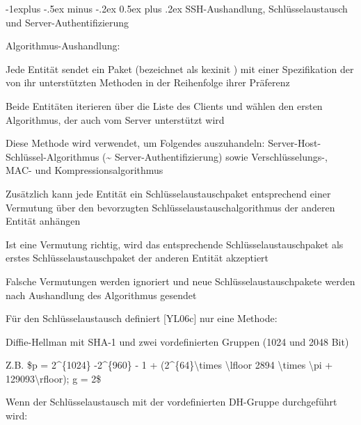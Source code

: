 \documentclass[a4paper]{article}
\makeatletter
\renewcommand{\subsection}{\@startsection{subsection}{2}{0mm}%
 {-1explus -.5ex minus -.2ex}%
 {0.5ex plus .2ex}%
 {\normalfont\normalsize\bfseries}}
\makeatother
\begin{document}
\begin{multicols}{3}
\begin{itemize*}
            \subsection{SSH-Aushandlung, Schlüsselaustausch und
                  Server-Authentifizierung}

            \begin{itemize*}
                  \item
                  Algorithmus-Aushandlung:

                  \begin{itemize*}
                        \item Jede Entität sendet ein Paket (bezeichnet als kexinit ) mit einer Spezifikation der von ihr unterstützten Methoden in der Reihenfolge ihrer Präferenz
                        \item Beide Entitäten iterieren über die Liste des Clients und wählen den ersten Algorithmus, der auch vom Server unterstützt wird
                        \item Diese Methode wird verwendet, um Folgendes auszuhandeln: Server-Host-Schlüssel-Algorithmus (\textasciitilde{} Server-Authentifizierung) sowie Verschlüsselungs-, MAC- und Kompressionsalgorithmus
                        \item Zusätzlich kann jede Entität ein Schlüsselaustauschpaket entsprechend einer Vermutung über den bevorzugten Schlüsselaustauschalgorithmus der anderen Entität anhängen
                        \item Ist eine Vermutung richtig, wird das entsprechende Schlüsselaustauschpaket als erstes Schlüsselaustauschpaket der anderen Entität akzeptiert
                        \item Falsche Vermutungen werden ignoriert und neue Schlüsselaustauschpakete werden nach Aushandlung des Algorithmus gesendet
                  \end{itemize*}
                  \item
                  Für den Schlüsselaustausch definiert {[}YL06c{]} nur eine Methode:

                  \begin{itemize*}
                        \item Diffie-Hellman mit SHA-1 und zwei vordefinierten Gruppen (1024 und 2048 Bit)
                        \item Z.B. \$p = 2\^{}\{1024\} -2\^{}\{960\} - 1 + (2\^{}\{64\}\textbackslash times \textbackslash lfloor 2894 \textbackslash times \textbackslash pi + 129093\textbackslash rfloor); g = 2\$
                  \end{itemize*}
                  \item
                  Wenn der Schlüsselaustausch mit der vordefinierten DH-Gruppe
                  durchgeführt wird:


\end{itemize*}
\end{itemize*}
\end{multicols}
\end{document}
